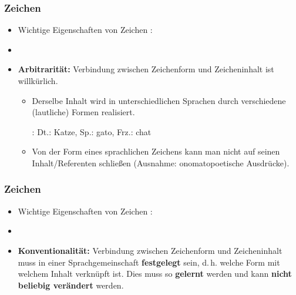 \begin{frame}
\frametitle{Zeichen}

\begin{itemize}
	\item Wichtige Eigenschaften von Zeichen \citep[vgl.][]{Saussure16x}:
	
	\item[]
		
	\item \textbf{Arbitrarität:} Verbindung zwischen Zeichenform und Zeicheninhalt ist willkürlich.
	
	\begin{itemize}
		\item Derselbe Inhalt wird in unterschiedlichen Sprachen durch verschiedene (lautliche) Formen realisiert.
		
		\ea {}: Dt.: Katze, Sp.: gato, Frz.: chat
		\z 
		
		\item Von der Form eines sprachlichen Zeichens kann man nicht auf seinen Inhalt/Referenten schließen (Ausnahme: onomatopoetische Ausdrücke).
	\end{itemize}
	

	
\end{itemize}

\end{frame}


\begin{frame}
	\frametitle{Zeichen}

\begin{itemize}
	\item Wichtige Eigenschaften von Zeichen \citep[vgl.][]{Saussure16x}:

	\item[]
	
	\item \textbf{Konventionalität:} Verbindung zwischen Zeichenform und Zeicheninhalt muss in einer Sprachgemeinschaft \textbf{festgelegt} sein, d.\,h. welche Form mit welchem Inhalt verknüpft ist. Dies muss so \textbf{gelernt} werden und kann \textbf{nicht beliebig verändert} werden.
\end{itemize}

\end{frame}


